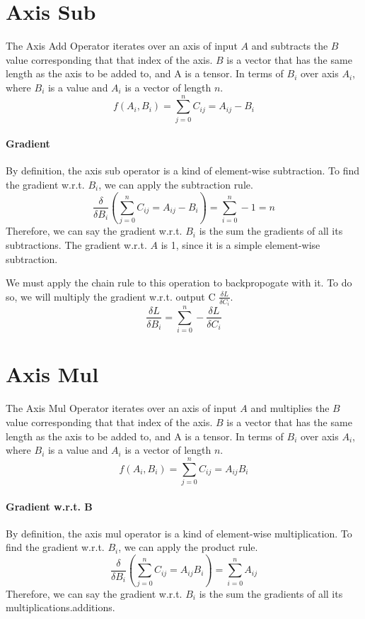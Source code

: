 \documentclass{report}
\begin{document}
        \section{Axis Sub}
            The Axis Add Operator iterates over an axis of input $A$ and subtracts the $B$ value corresponding that that index of the axis.
            $B$ is a vector that has the same length as the axis to be added to, and A is a tensor.
            In terms of $B_i$ over axis $A_i$, where $B_i$ is a value and $A_i$ is a vector of length $n$. 
            $$f(A_i, B_i) = \sum_{j=0}^{n} C_{ij} = A_{ij} - B_i$$

            \paragraph{Gradient}
            By definition, the axis sub operator is a kind of element-wise subtraction. To find the gradient w.r.t. $B_i$, 
            we can apply the subtraction rule.
            $$\frac{\delta}{\delta{B_i}}(\sum_{j=0}^{n} C_{ij} = A_{ij} - B_i) = \sum_{i=0}^{n} -1 = n$$
            Therefore, we can say the gradient w.r.t. $B_i$ is the sum the gradients of all its subtractions. 
            The gradient w.r.t. $A$ is 1, since it is a simple element-wise subtraction.

            We must apply the chain rule to this operation to backpropogate with it. To do so, 
            we will multiply the gradient w.r.t. output C $\frac{\delta{L}}{\delta{C_i}}$. 
            $$\frac{\delta{L}}{\delta{B_i}} = \sum_{i=0}^{n} -\frac{\delta{L}}{\delta{C_i}}$$

        \section{Axis Mul}
            The Axis Mul Operator iterates over an axis of input $A$ and multiplies the $B$ value corresponding that that index of the axis.
            $B$ is a vector that has the same length as the axis to be added to, and A is a tensor.
            In terms of $B_i$ over axis $A_i$, where $B_i$ is a value and $A_i$ is a vector of length $n$. 
            $$f(A_i, B_i) = \sum_{j=0}^{n} C_{ij} = A_{ij}B_i$$

            \paragraph{Gradient w.r.t. B}
            By definition, the axis mul operator is a kind of element-wise multiplication. To find the gradient w.r.t. $B_i$, 
            we can apply the product rule.
            $$\frac{\delta}{\delta{B_i}}(\sum_{j=0}^{n} C_{ij} = A_{ij}B_i) = \sum_{i=0}^{n} A_{ij}$$
            Therefore, we can say the gradient w.r.t. $B_i$ is the sum the gradients of all its multiplications.additions.
\end{document}
